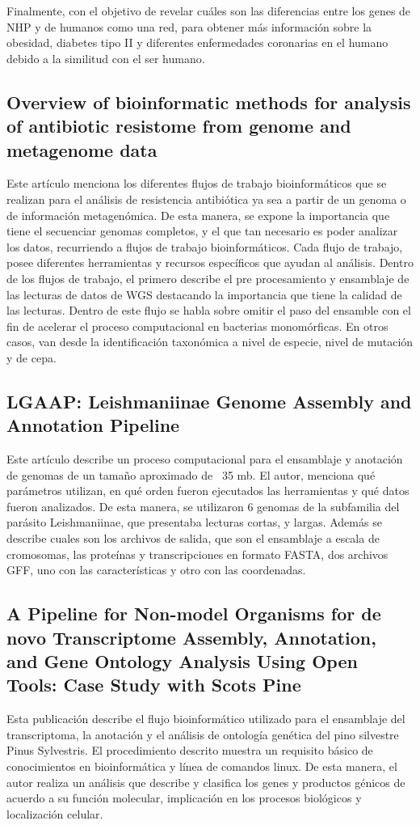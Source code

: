 \documentclass[12pt]{article}
\begin{document}
Finalmente, con el objetivo de revelar cuáles son las diferencias entre los genes de NHP y de humanos como una red, para obtener más información sobre la obesidad, diabetes tipo II y diferentes enfermedades coronarias en el humano debido a la similitud con el ser humano.



\subsection*{Overview of bioinformatic methods for analysis of antibiotic resistome from genome and metagenome data}
Este artículo menciona los diferentes flujos de trabajo bioinformáticos que se realizan para el análisis de resistencia antibiótica ya sea a partir de un genoma o de información metagenómica.  De esta manera, se expone la importancia que tiene el secuenciar genomas completos, y el que tan necesario es poder analizar los datos, recurriendo a flujos de trabajo bioinformáticos. Cada flujo de trabajo, posee diferentes herramientas y recursos específicos que ayudan al análisis. Dentro de los flujos de trabajo, el primero describe el pre procesamiento y ensamblaje de las lecturas de datos de WGS destacando la importancia que tiene la calidad de las lecturas. Dentro de este flujo se habla sobre omitir el paso del ensamble con el fin de acelerar el proceso computacional en bacterias monomórficas. En otros casos, van desde la identificación taxonómica a nivel de especie, nivel de mutación y de cepa.

\subsection*{LGAAP: Leishmaniinae Genome Assembly and Annotation Pipeline}
Este artículo describe un proceso computacional para el ensamblaje y anotación de genomas de un tamaño aproximado de ~35 mb. El autor, menciona qué parámetros utilizan, en qué orden fueron ejecutados las herramientas y qué datos fueron analizados.  De esta manera, se utilizaron 6 genomas de la subfamilia del parásito Leishmaniinae, que presentaba lecturas cortas, y largas. Además se describe cuales son los archivos de salida, que son el ensamblaje a escala de cromosomas, las proteínas y transcripciones en formato FASTA, dos archivos GFF, uno con las características y otro con las coordenadas.

\subsection*{A Pipeline for Non-model Organisms for de novo Transcriptome Assembly, Annotation, and Gene Ontology Analysis Using Open Tools: Case Study with Scots Pine }
Esta publicación describe el flujo bioinformático utilizado para el ensamblaje del transcriptoma, la anotación y el análisis de ontología genética del pino silvestre Pinus Sylvestris. El procedimiento descrito muestra un requisito básico de conocimientos en bioinformática  y línea de comandos linux. De esta manera, el autor realiza un análisis que describe y clasifica los genes y productos génicos de acuerdo a su función molecular, implicación en los procesos biológicos y localización celular.
\end{document}
